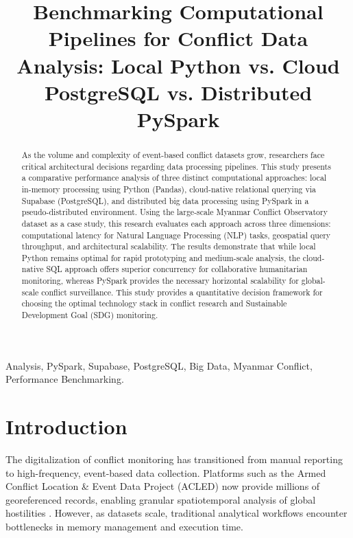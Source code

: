 \documentclass[conference]{IEEEtran}
\title{Benchmarking Computational Pipelines for Conflict Data Analysis: Local Python vs. Cloud PostgreSQL vs. Distributed PySpark}
\author{
    \IEEEauthorblockN{Tain Yan Tun}
    \IEEEauthorblockA{
        \textit{IT 422: Big Data} \\
        \textit{Asia Pacific International University} \\
        \textit{Department of Information Technology} \\
        Saraburi, Thailand \\
    }
}
\begin{document}
\maketitle

\begin{abstract}
    As the volume and complexity of event-based conflict datasets grow, researchers face critical architectural decisions regarding data processing pipelines. This study presents a comparative performance analysis of three distinct computational approaches: local in-memory processing using Python (Pandas), cloud-native relational querying via Supabase (PostgreSQL), and distributed big data processing using PySpark in a pseudo-distributed environment. Using the large-scale Myanmar Conflict Observatory dataset as a case study, this research evaluates each approach across three dimensions: computational latency for Natural Language Processing (NLP) tasks, geospatial query throughput, and architectural scalability. The results demonstrate that while local Python remains optimal for rapid prototyping and medium-scale analysis, the cloud-native SQL approach offers superior concurrency for collaborative humanitarian monitoring, whereas PySpark provides the necessary horizontal scalability for global-scale conflict surveillance. This study provides a quantitative decision framework for choosing the optimal technology stack in conflict research and Sustainable Development Goal (SDG) monitoring.
\end{abstract}

\begin{IEEEkeywords}
    Analysis, PySpark, Supabase, PostgreSQL, Big Data, Myanmar Conflict, Performance Benchmarking.
\end{IEEEkeywords}

\section{Introduction}

The digitalization of conflict monitoring has transitioned from manual reporting to high-frequency, event-based data collection. Platforms such as the Armed Conflict Location \& Event Data Project (ACLED) now provide millions of georeferenced records, enabling granular spatiotemporal analysis of global hostilities \cite{raleigh2010introducing}. However, as datasets scale, traditional analytical workflows encounter bottlenecks in memory management and execution time.
\end{document}

